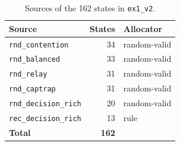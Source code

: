 \begin{table}[H]
\centering
\caption{Sources of the 162 states in \texttt{ex1\_v2}.}
\label{tab:appendix:sources}
\begin{tabular}{lrl}
\toprule
Source & States & Allocator \\
\midrule
\texttt{rnd\_contention} & 34 & random-valid \\
\texttt{rnd\_balanced} & 33 & random-valid \\
\texttt{rnd\_relay} & 31 & random-valid \\
\texttt{rnd\_captrap} & 31 & random-valid \\
\texttt{rnd\_decision\_rich} & 20 & random-valid \\
\texttt{rec\_decision\_rich} & 13 & rule \\
\midrule
\textbf{Total} & \textbf{162} & \\
\bottomrule
\end{tabular}
\end{table}
